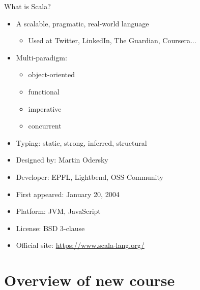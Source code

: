 \documentclass{lecturenotes}
\newcommand{\Section}[1]{\section{#1}\frame{\centering\huge\bfseries\textcolor{blue}{#1}}}
\begin{document}
\begin{Slide}{What is Scala?}
\begin{itemize}
\item A scalable, pragmatic, real-world language
\begin{itemize}
\item Used at Twitter, LinkedIn, The Guardian, Coursera...
\end{itemize}

\item Multi-paradigm:
\begin{itemize}
\item object-oriented
\item functional
\item imperative
\item concurrent
\end{itemize}
\item Typing: static, strong, inferred, structural

\item Designed by: Martin Odersky
\item Developer: EPFL, Lightbend, OSS Community
\item First appeared:  January 20, 2004
\item Platform: JVM, JavaScript
\item License: BSD 3-clause
\item Official site: \url{https://www.scala-lang.org/}
\end{itemize}
\end{Slide}


\Section{Overview of new course}
\end{document}
